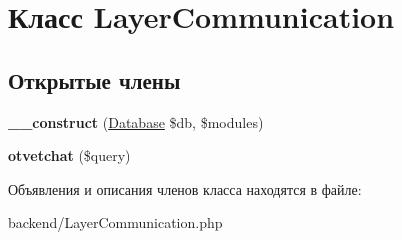 \hypertarget{classLayerCommunication}{}\section{Класс Layer\+Communication}
\label{classLayerCommunication}
\subsection*{Открытые члены}
\begin{DoxyCompactItemize}
\item 
\hypertarget{classLayerCommunication_a53c655ae003463769c4f9010d0ff6f1f}{}{\bfseries \+\_\+\+\_\+construct} (\hyperlink{classDatabase}{Database} \$db, \$modules)\label{classLayerCommunication_a53c655ae003463769c4f9010d0ff6f1f}

\item 
\hypertarget{classLayerCommunication_a28f965d9e36a8f3997663d7ac81de816}{}{\bfseries otvetchat} (\$query)\label{classLayerCommunication_a28f965d9e36a8f3997663d7ac81de816}

\end{DoxyCompactItemize}


Объявления и описания членов класса находятся в файле\+:\begin{DoxyCompactItemize}
\item 
backend/Layer\+Communication.\+php\end{DoxyCompactItemize}
